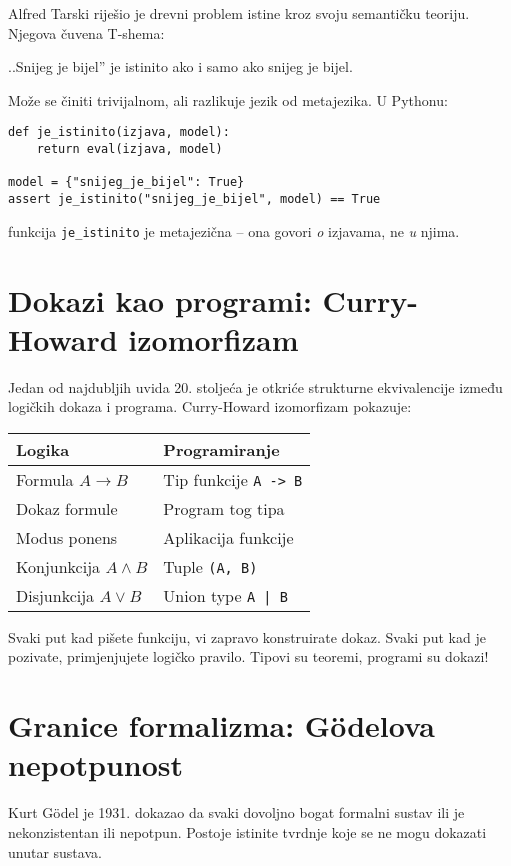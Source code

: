 Alfred Tarski riješio je drevni problem istine kroz svoju semantičku teoriju. Njegova čuvena T-shema:


..Snijeg je bijel'' je istinito ako i samo ako snijeg je bijel.


Može se činiti trivijalnom, ali razlikuje jezik od metajezika. U Pythonu:
\begin{verbatim}
def je_istinito(izjava, model):
    return eval(izjava, model)

model = {"snijeg_je_bijel": True}
assert je_istinito("snijeg_je_bijel", model) == True
\end{verbatim}


funkcija \texttt{je\_istinito} je metajezična -- ona govori \emph{o} izjavama, ne \emph{u} njima.


\section{Dokazi kao programi: Curry-Howard izomorfizam}


Jedan od najdubljih uvida 20. stoljeća je otkriće strukturne ekvivalencije između logičkih dokaza i programa. Curry-Howard izomorfizam pokazuje:


\begin{center}
\begin{tabular}{l|l}
\textbf{Logika} & \textbf{Programiranje} \\
\hline
Formula $A \rightarrow B$ & Tip funkcije \texttt{A -> B} \\
Dokaz formule & Program tog tipa \\
Modus ponens & Aplikacija funkcije \\
Konjunkcija $A \wedge B$ & Tuple \texttt{(A, B)} \\
Disjunkcija $A \vee B$ & Union type \texttt{A | B} \\
\end{tabular}
\end{center}


Svaki put kad pišete funkciju, vi zapravo konstruirate dokaz. Svaki put kad je pozivate, primjenjujete logičko pravilo. Tipovi su teoremi, programi su dokazi!


\section{Granice formalizma: Gödelova nepotpunost}


Kurt Gödel je 1931. dokazao da svaki dovoljno bogat formalni sustav ili je nekonzistentan ili nepotpun. Postoje istinite tvrdnje koje se ne mogu dokazati unutar sustava.


